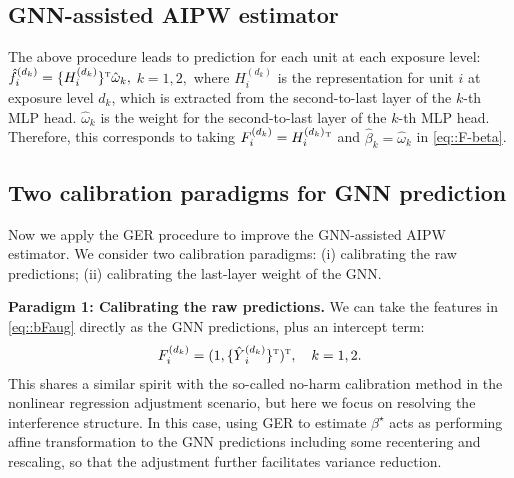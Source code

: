\documentclass{article}
\theoremstyle{plain}
\theoremstyle{definition}
\theoremstyle{remark}
\def\T{{\textsc{t}}}
\newcommand{\indicator}{\mathbbm{1}}
\begin{document}
\subsection{GNN-assisted AIPW estimator}
The above procedure leads to prediction for each unit at each exposure level: $\hat{f}_i^{(d_k)} = \{H_i^{(d_k)}\}{}^\T \hat{\omega}_k,$ $k=1,2,$ 
where $H_i^{(d_k)}$ is the representation for unit $i$ at exposure level $d_k$, which is extracted from the second-to-last layer of the $k$-th MLP head. $\hat{\omega}_k$ is the weight for the second-to-last layer of the $k$-th MLP head. Therefore, this corresponds to taking $F_i^{(d_k)} = H_i^{(d_k)}{}^\T$ and $\hat\beta_k = \hat{\omega}_k$ in \eqref{eq::F-beta}.





\subsection{Two calibration paradigms for GNN prediction}
Now we apply the GER procedure to improve the GNN-assisted AIPW estimator. We consider two calibration paradigms: (i) calibrating the raw predictions; (ii) calibrating the last-layer weight of the GNN.



\textbf{Paradigm 1: Calibrating the raw predictions.} We can take the features in \eqref{eq::bFaug} directly as the GNN predictions, plus an intercept term:
\begin{align*}
    F_i^{(d_k)} = (1, \{\hat{Y}{}_i^{(d_k)}\}{}^\T)^\T, \quad k=1,2.
\end{align*} 
This shares a similar spirit with the so-called no-harm calibration method \citep{fogarty2018regression} in the nonlinear regression adjustment scenario, but here we focus on resolving the interference structure. In this case, using GER to estimate $\beta^\star$ acts as performing affine transformation to the GNN predictions including some recentering and rescaling, so that the adjustment further facilitates variance reduction.
\end{document}
